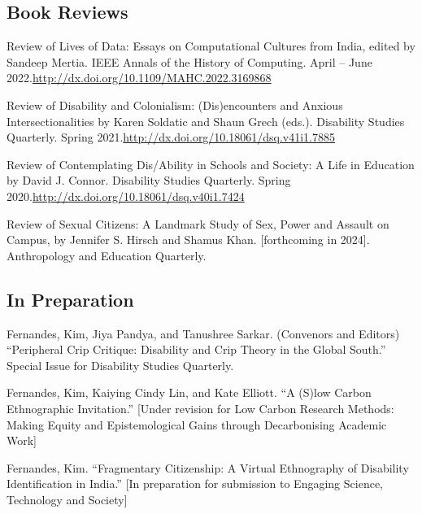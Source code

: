\documentclass[11pt,letterpaper]{report}
\newcommand{\listitemspace}{0.25em}
\renewenvironment{itemize}{\begin{list}{}{\setlength{\leftmargin}{0em}\setlength{\parskip}{0em}\setlength{\itemsep}{\listitemspace}\setlength{\parsep}{\listitemspace}}}{\end{list}}
\begin{document}
    \subsection*{Book Reviews}
    \begin{itemize}
        \item Review of Lives of Data: Essays on Computational Cultures from India, edited by Sandeep Mertia. IEEE Annals of the History of Computing. April – June 2022.\newline\href{http://dx.doi.org/10.1109/MAHC.2022.3169868}{http://dx.doi.org/10.1109/MAHC.2022.3169868}
        \item Review of Disability and Colonialism: (Dis)encounters and Anxious Intersectionalities by Karen Soldatic and Shaun Grech (eds.). Disability Studies Quarterly. Spring 2021.\newline\href{http://dx.doi.org/10.18061/dsq.v41i1.7885}{http://dx.doi.org/10.18061/dsq.v41i1.7885}
        \item Review of Contemplating Dis/Ability in Schools and Society: A Life in Education by David J. Connor. Disability Studies Quarterly. Spring 2020.\newline\href{http://dx.doi.org/10.18061/dsq.v40i1.7424}{http://dx.doi.org/10.18061/dsq.v40i1.7424}
        \item Review of Sexual Citizens: A Landmark Study of Sex, Power and Assault on Campus, by Jennifer S. Hirsch and Shamus Khan. [forthcoming in 2024]. Anthropology and Education Quarterly.
    \end{itemize}
    \subsection*{In Preparation}
    \begin{itemize}
        \item Fernandes, Kim, Jiya Pandya, and Tanushree Sarkar. (Convenors and Editors) “Peripheral Crip Critique: Disability and Crip Theory in the Global South.” Special Issue for Disability Studies Quarterly.
        \item Fernandes, Kim, Kaiying Cindy Lin, and Kate Elliott. “A (S)low Carbon Ethnographic Invitation.” [Under revision for Low Carbon Research Methods: Making Equity and Epistemological Gains through Decarbonising Academic Work]
        \item Fernandes, Kim. “Fragmentary Citizenship: A Virtual Ethnography of Disability Identification in India.” [In preparation for submission to Engaging Science, Technology and Society]
    \end{itemize}
\end{document}
